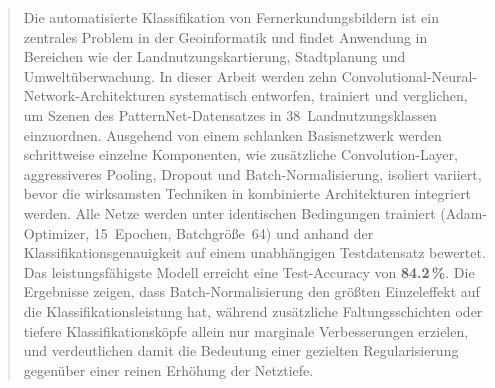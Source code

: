 \begin{abstract}
    Die automatisierte Klassifikation von Fernerkundungsbildern ist ein zentrales Problem in der Geoinformatik und findet Anwendung in Bereichen wie der Landnutzungskartierung, Stadtplanung und Umweltüberwachung.
    In dieser Arbeit werden zehn Convolutional-Neural-Network-Architekturen systematisch entworfen, trainiert und verglichen, um Szenen des PatternNet-Datensatzes in 38~Landnutzungsklassen einzuordnen.
    Ausgehend von einem schlanken Basisnetzwerk werden schrittweise einzelne Komponenten, wie zusätzliche Convolution-Layer, aggressiveres Pooling, Dropout und Batch-Normalisierung, isoliert variiert, bevor die wirksamsten Techniken in kombinierte Architekturen integriert werden.
    Alle Netze werden unter identischen Bedingungen trainiert (Adam-Optimizer, 15~Epochen, Batchgröße~64) und anhand der Klassifikationsgenauigkeit auf einem unabhängigen Testdatensatz bewertet.
    Das leistungsfähigste Modell erreicht eine Test-Accuracy von \textbf{84.2\,\%}.
    Die Ergebnisse zeigen, dass Batch-Normalisierung den größten Einzeleffekt auf die Klassifikationsleistung hat, während zusätzliche Faltungsschichten oder tiefere Klassifikationsköpfe allein nur marginale Verbesserungen erzielen, und verdeutlichen damit die Bedeutung einer gezielten Regularisierung gegenüber einer reinen Erhöhung der Netztiefe.
\end{abstract}